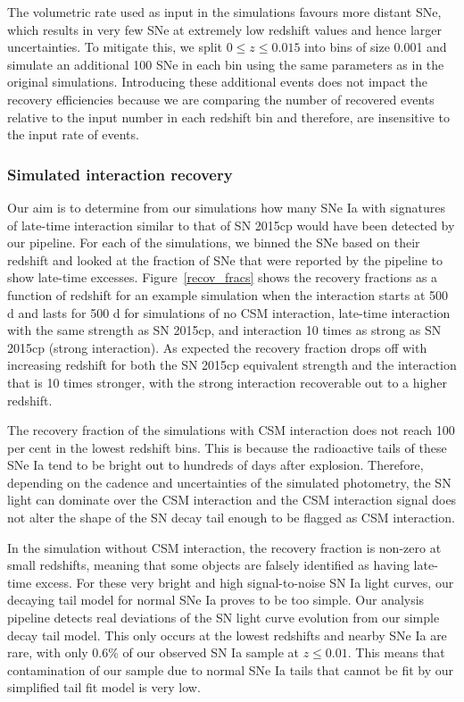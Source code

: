 \documentclass[a4paper,oneside,12pt, class=Latex/Classes/PhDthesisPSnPDF, crop=false]{standalone}
\begin{document}
The volumetric rate used as input in the simulations favours more distant SNe, which results in very few SNe at extremely low redshift values and hence larger uncertainties. To mitigate this, we split $0\leq z\leq 0.015$ into bins of size 0.001 and simulate an additional 100 SNe in each bin using the same parameters as in the original simulations. Introducing these additional events does not impact the recovery efficiencies because we are comparing the number of recovered events relative to the input number in each redshift bin and therefore, are insensitive to the input rate of events. 


\subsubsection{Simulated interaction recovery}
\label{simulated_reco}
Our aim is to determine from our simulations how many SNe Ia with signatures of late-time interaction similar to that of SN 2015cp would have been detected by our pipeline. For each of the simulations, we binned the SNe based on their redshift and looked at the fraction of SNe that were reported by the pipeline to show late-time excesses. Figure~\ref{recov_fracs} shows the recovery fractions as a function of redshift for an example simulation when the interaction starts at 500\,d and lasts for 500 d for simulations of no CSM interaction, late-time interaction with the same strength as SN 2015cp, and interaction 10 times as strong as SN 2015cp (strong interaction). As expected the recovery fraction drops off with increasing redshift for both the SN 2015cp equivalent strength and the interaction that is 10 times stronger, with the strong interaction recoverable out to a higher redshift. 

The recovery fraction of the simulations with CSM interaction does not reach 100 per cent in the lowest redshift bins. This is because the radioactive tails of these SNe Ia tend to be bright out to hundreds of days after explosion. Therefore, depending on the cadence and uncertainties of the simulated photometry, the SN light can dominate over the CSM interaction and the CSM interaction signal does not alter the shape of the SN decay tail enough to be flagged as CSM interaction. 

In the simulation without CSM interaction, the recovery fraction is non-zero at small redshifts, meaning that some objects are falsely identified as having late-time excess. For these very bright and high signal-to-noise SN Ia light curves, our decaying tail model for normal SNe Ia proves to be too simple. Our analysis pipeline detects real deviations of the SN light curve evolution from our simple decay tail model. This only occurs at the lowest redshifts and nearby SNe Ia are rare, with only 0.6\% of our observed SN Ia sample at $z\leq0.01$. This means that contamination of our sample due to normal SNe Ia tails that cannot be fit by our simplified tail fit model is very low. 
\end{document}
